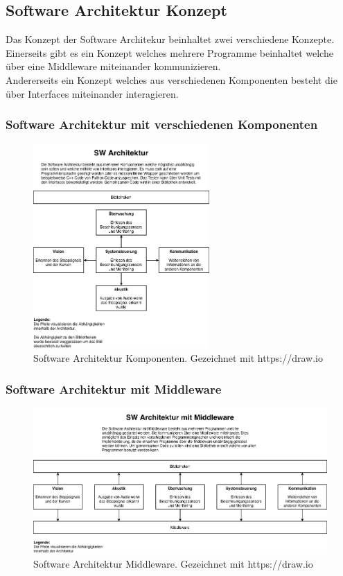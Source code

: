 \documentclass[../../main.tex]{subfiles}
\begin{document}
\subsection{Software Architektur Konzept}
Das Konzept der Software Architekur beinhaltet zwei verschiedene Konzepte.
Einerseits gibt es ein Konzept welches mehrere Programme beinhaltet welche über eine Middleware miteinander kommunizieren. \\
Andererseits ein Konzept welches aus verschiedenen Komponenten besteht die über Interfaces miteinander interagieren. \\

\subsubsection{Software Architektur mit verschiedenen Komponenten}
\begin{figure}[H] %
    \centering
    \includegraphics[width=0.6\textwidth]{../../drawings/ArchitekturDiagramm/SW_Architektur.png}
    \caption {Software Architektur Komponenten. Gezeichnet mit https://draw.io}
\end{figure}

\subsubsection{Software Architektur mit Middleware}
\begin{figure}[H] %
    \centering
    \includegraphics[width=1.0\textwidth]{../../drawings/ArchitekturDiagramm/SW_Architektur_Middleware.png}
    \caption {Software Architektur Middleware. Gezeichnet mit https://draw.io}
\end{figure}
\end{document}
